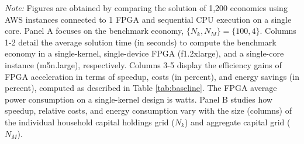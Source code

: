 \documentclass[12pt,american]{article}
\makeatletter
\newcommand{\resultsfolder}{./results}
\newcommand{\cpuI}{m5n.large\@\xspace}
\newcommand{\awsinstfI}{f1.2xlarge\@\xspace}
\newcommand{\fpgaIknlIpowerconsumption}{}
\newcommand{\numbeconII}{1,200\@\xspace}
\makeatother
\begin{document}
\begin{table}[ht!]
\begin{center}
\begin{subtable}{\textwidth}
\end{subtable}
\end{center}
\small \textit{Note:} Figures are obtained by comparing the solution of \numbeconII economies using AWS instances connected to 1 FPGA and sequential CPU execution on a single core. Panel A focuses on the benchmark economy, $\{N_k,N_M\}=\{100,4\}$. Columns 1-2 detail the average solution time (in seconds) to compute the benchmark economy in a single-kernel, single-device FPGA (\awsinstfI), and a single-core instance (\cpuI), respectively. Columns 3-5 display the efficiency gains of FPGA acceleration in terms of speedup, costs (in percent), and energy savings (in percent), computed as described in Table \ref{tab:baseline}. The FPGA average power consumption on a single-kernel design is \fpgaIknlIpowerconsumption watts. Panel B studies how speedup, relative costs, and energy consumption vary with the size (columns) of the individual household capital holdings grid ($N_k$) and aggregate capital grid ($N_M$). 
\end{table}
\end{document}
